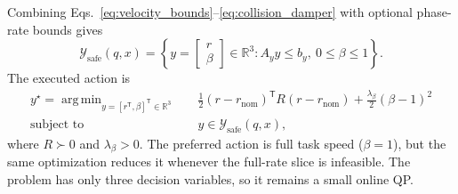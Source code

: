 \documentclass[preprint,12pt]{elsarticle}
\DeclareMathOperator*{\argmin}{arg\,min}
\newcommand{\R}{\mathbb{R}}
\newcommand{\T}{^{\mathsf T}}
\begin{document}
Combining Eqs.~\eqref{eq:velocity_bounds}--\eqref{eq:collision_damper} with optional phase-rate bounds gives
\begin{equation}
\mathcal Y_{\mathrm{safe}}(q,x)
=
\left\{y=\begin{bmatrix}r\\\beta\end{bmatrix}\in\R^3:A_y y\leq b_y,\ 0\leq\beta\leq1\right\}.
\label{eq:safe_polytope}
\end{equation}
The executed action is
\begin{equation}
\begin{aligned}
y^\star
=
\argmin_{y=[r\T,\beta]\T\in\R^3}\quad&
\frac{1}{2}(r-r_{\mathrm{nom}})\T R(r-r_{\mathrm{nom}})
+\frac{\lambda_\beta}{2}(\beta-1)^2\\
\text{subject to}\quad& y\in\mathcal Y_{\mathrm{safe}}(q,x),
\end{aligned}
\label{eq:phase_qp}
\end{equation}
where $R\succ0$ and $\lambda_\beta>0$. The preferred action is full task speed ($\beta=1$), but the same optimization reduces it whenever the full-rate slice is infeasible. The problem has only three decision variables, so it remains a small online QP.
\end{document}
